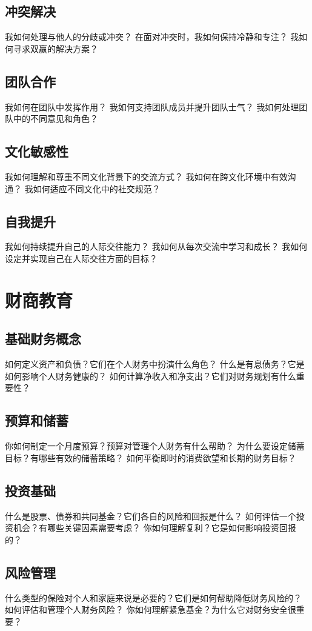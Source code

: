 \documentclass[12pt]{book}
\begin{document}
\subsection{冲突解决}
我如何处理与他人的分歧或冲突？
在面对冲突时，我如何保持冷静和专注？
我如何寻求双赢的解决方案？

\subsection{团队合作}
我如何在团队中发挥作用？
我如何支持团队成员并提升团队士气？
我如何处理团队中的不同意见和角色？


\subsection{文化敏感性}
我如何理解和尊重不同文化背景下的交流方式？
我如何在跨文化环境中有效沟通？
我如何适应不同文化中的社交规范？

\subsection{自我提升}
我如何持续提升自己的人际交往能力？
我如何从每次交流中学习和成长？
我如何设定并实现自己在人际交往方面的目标？

\section{财商教育}
\subsection{基础财务概念}
如何定义资产和负债？它们在个人财务中扮演什么角色？
什么是有息债务？它是如何影响个人财务健康的？
如何计算净收入和净支出？它们对财务规划有什么重要性？

\subsection{预算和储蓄}
你如何制定一个月度预算？预算对管理个人财务有什么帮助？
为什么要设定储蓄目标？有哪些有效的储蓄策略？
如何平衡即时的消费欲望和长期的财务目标？

\subsection{投资基础}
什么是股票、债券和共同基金？它们各自的风险和回报是什么？
如何评估一个投资机会？有哪些关键因素需要考虑？
你如何理解复利？它是如何影响投资回报的？

\subsection{风险管理}
什么类型的保险对个人和家庭来说是必要的？它们是如何帮助降低财务风险的？
如何评估和管理个人财务风险？
你如何理解紧急基金？为什么它对财务安全很重要？
\end{document}
